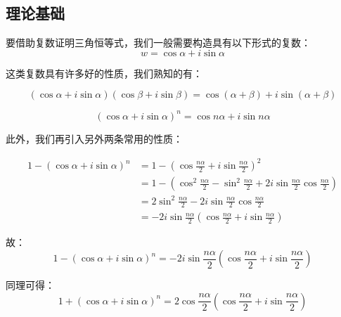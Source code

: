 
\begin{issues}
\issueTODO
\end{issues}


\subsection{理论基础}
要借助复数证明三角恒等式，我们一般需要构造具有以下形式的复数：
$$w=\cos \alpha+i\sin\alpha$$

这类复数具有许多好的性质，我们熟知的有：

\begin{equation}%
(\cos\alpha+i\sin\alpha)(\cos\beta+i\sin\beta)=\cos(\alpha+\beta)+i\sin(\alpha+\beta)
\end{equation}

\begin{equation}%
(\cos\alpha+i\sin\alpha)^n=\cos n\alpha+i\sin n\alpha
\end{equation}

此外，我们再引入另外两条常用的性质：

$$\begin{aligned}
 1-(\cos\alpha+i\sin\alpha)^n&=1-\left(\cos{\frac{n\alpha}2+i\sin{\frac{n\alpha}2}}\right)^{2}\\ &=1-\left(\cos^2{\frac{n\alpha}2}-\sin^2{\frac{n\alpha}2}+2i\sin{\frac{n\alpha}2}\cos{\frac{n\alpha}2}\right)\\ &=2\sin^2{\frac{n\alpha}2}-2i\sin{\frac{n\alpha}2}\cos{\frac{n\alpha}2}\\ &=-2i\sin{\frac{n\alpha}2}\left(\cos{\frac{n\alpha}2}+i\sin{\frac{n\alpha}2}\right) 
\end{aligned}$$

故：
\begin{equation}\label{eq_TriCom_4}
1-(\cos\alpha+i\sin\alpha)^n=-2i\sin{\frac{n\alpha}2}\left(\cos{\frac{n\alpha}2}+i\sin{\frac{n\alpha}2}\right)
\end{equation}

同理可得：
\begin{equation}\label{eq_TriCom_5}%
1+(\cos\alpha+i\sin\alpha)^n=2\cos{\frac{n\alpha}2}\left(\cos{\frac{n\alpha}2}+i\sin{\frac{n\alpha}2}\right)
\end{equation}

